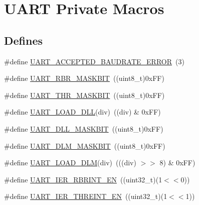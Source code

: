 \hypertarget{group___u_a_r_t___private___macros}{\section{\-U\-A\-R\-T \-Private \-Macros}
\label{group___u_a_r_t___private___macros}
}
\subsection*{\-Defines}
\begin{DoxyCompactItemize}
\item 
\#define \hyperlink{group___u_a_r_t___private___macros_ga3b318954fbe283fa5da4dad6990b0b20}{\-U\-A\-R\-T\-\_\-\-A\-C\-C\-E\-P\-T\-E\-D\-\_\-\-B\-A\-U\-D\-R\-A\-T\-E\-\_\-\-E\-R\-R\-O\-R}~(3)
\item 
\#define \hyperlink{group___u_a_r_t___private___macros_ga06774e65c2ca095c4373122ed9a390b8}{\-U\-A\-R\-T\-\_\-\-R\-B\-R\-\_\-\-M\-A\-S\-K\-B\-I\-T}~((uint8\-\_\-t)0x\-F\-F)
\item 
\#define \hyperlink{group___u_a_r_t___private___macros_ga1592b78e87967ae6a06756679cfc855e}{\-U\-A\-R\-T\-\_\-\-T\-H\-R\-\_\-\-M\-A\-S\-K\-B\-I\-T}~((uint8\-\_\-t)0x\-F\-F)
\item 
\#define \hyperlink{group___u_a_r_t___private___macros_ga55a89461d99a43769772276e51a6710a}{\-U\-A\-R\-T\-\_\-\-L\-O\-A\-D\-\_\-\-D\-L\-L}(div)~((div) \& 0x\-F\-F)
\item 
\#define \hyperlink{group___u_a_r_t___private___macros_ga85050a24048ffc2de997cd60ea67f9df}{\-U\-A\-R\-T\-\_\-\-D\-L\-L\-\_\-\-M\-A\-S\-K\-B\-I\-T}~((uint8\-\_\-t)0x\-F\-F)
\item 
\#define \hyperlink{group___u_a_r_t___private___macros_gaf4d480e07f82896893e45b572adeffcd}{\-U\-A\-R\-T\-\_\-\-D\-L\-M\-\_\-\-M\-A\-S\-K\-B\-I\-T}~((uint8\-\_\-t)0x\-F\-F)
\item 
\#define \hyperlink{group___u_a_r_t___private___macros_gac53f4cc36f13edd3fdf7fd9bab1360e2}{\-U\-A\-R\-T\-\_\-\-L\-O\-A\-D\-\_\-\-D\-L\-M}(div)~(((div) $>$$>$ 8) \& 0x\-F\-F)
\item 
\#define \hyperlink{group___u_a_r_t___private___macros_gad6400102a6ec4fa634656b7ef18d1eba}{\-U\-A\-R\-T\-\_\-\-I\-E\-R\-\_\-\-R\-B\-R\-I\-N\-T\-\_\-\-E\-N}~((uint32\-\_\-t)(1$<$$<$0))
\item 
\#define \hyperlink{group___u_a_r_t___private___macros_ga6ad0b05af9d9599e6ce9dd5521c2aa74}{\-U\-A\-R\-T\-\_\-\-I\-E\-R\-\_\-\-T\-H\-R\-E\-I\-N\-T\-\_\-\-E\-N}~((uint32\-\_\-t)(1$<$$<$1))
$$
\end{DoxyCompactItemize}
